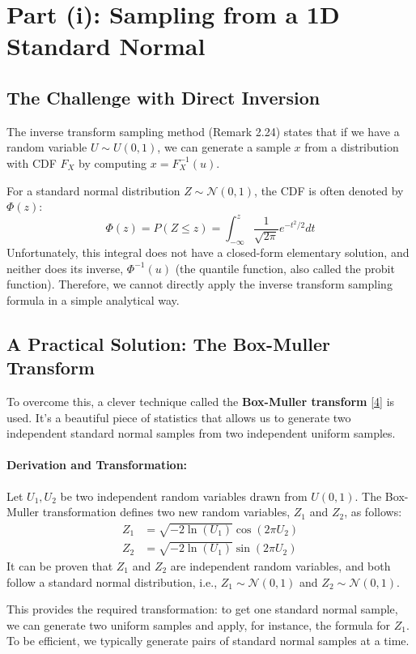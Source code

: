 \documentclass[11pt,a4paper]{article}
\newcommand{\N}{\mathcal{N}}
\begin{document}
\section{Part (i): Sampling from a 1D Standard Normal}

\subsection{The Challenge with Direct Inversion}
The inverse transform sampling method (Remark 2.24) states that if we have a random variable $U \sim U(0,1)$, we can generate a sample $x$ from a distribution with CDF $F_X$ by computing $x = F_X^{-1}(u)$.

For a standard normal distribution $Z \sim \N(0,1)$, the CDF is often denoted by $\Phi(z)$:
\[ \Phi(z) = P(Z \le z) = \int_{-\infty}^{z} \frac{1}{\sqrt{2\pi}} e^{-t^2/2} dt \]
Unfortunately, this integral does not have a closed-form elementary solution, and neither does its inverse, $\Phi^{-1}(u)$ (the quantile function, also called the probit function). Therefore, we cannot directly apply the inverse transform sampling formula in a simple analytical way.

\subsection{A Practical Solution: The Box-Muller Transform}
To overcome this, a clever technique called the \textbf{Box-Muller transform} \hyperref[concept:boxmuller]{[4]} is used. It's a beautiful piece of statistics that allows us to generate two independent standard normal samples from two independent uniform samples.

\paragraph{Derivation and Transformation:}
Let $U_1, U_2$ be two independent random variables drawn from $U(0,1)$. The Box-Muller transformation defines two new random variables, $Z_1$ and $Z_2$, as follows:
\begin{align}
    Z_1 &= \sqrt{-2 \ln(U_1)} \cos(2\pi U_2) \\
    Z_2 &= \sqrt{-2 \ln(U_1)} \sin(2\pi U_2)
\end{align}
It can be proven that $Z_1$ and $Z_2$ are independent random variables, and both follow a standard normal distribution, i.e., $Z_1 \sim \N(0,1)$ and $Z_2 \sim \N(0,1)$.

This provides the required transformation: to get one standard normal sample, we can generate two uniform samples and apply, for instance, the formula for $Z_1$. To be efficient, we typically generate pairs of standard normal samples at a time.
\end{document}

